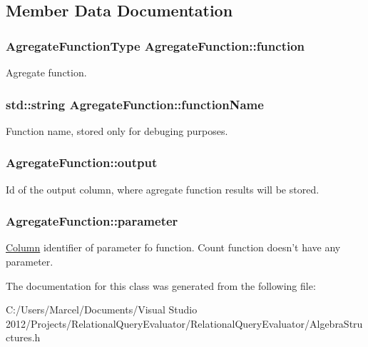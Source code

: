\subsection{Member Data Documentation}
\hypertarget{class_agregate_function_afc2ef5318021e8fa5aac765f48cc2561}{
\subsubsection[{function}]{\setlength{\rightskip}{0pt plus 5cm}Agregate\+Function\+Type Agregate\+Function\+::function}}\label{class_agregate_function_afc2ef5318021e8fa5aac765f48cc2561}
Agregate function. \hypertarget{class_agregate_function_a06046f10f3072c4ef6300b51f283ed3f}{
\subsubsection[{function\+Name}]{\setlength{\rightskip}{0pt plus 5cm}std\+::string Agregate\+Function\+::function\+Name}}\label{class_agregate_function_a06046f10f3072c4ef6300b51f283ed3f}
Function name, stored only for debuging purposes. \hypertarget{class_agregate_function_ae78c0ff39b17f1d341f89c6660d7f448}{
\subsubsection[{output}]{ Agregate\+Function\+::output}}\label{class_agregate_function_ae78c0ff39b17f1d341f89c6660d7f448}
Id of the output column, where agregate function results will be stored. \hypertarget{class_agregate_function_ad37427d3dee4bc5dc7a76d5997bb22fc}{
\subsubsection[{parameter}]{ Agregate\+Function\+::parameter}}\label{class_agregate_function_ad37427d3dee4bc5dc7a76d5997bb22fc}
\hyperlink{class_column}{Column} identifier of parameter fo function. Count function doesn't have any parameter. 

The documentation for this class was generated from the following file\+:\begin{DoxyCompactItemize}
\item 
C\+:/\+Users/\+Marcel/\+Documents/\+Visual Studio 2012/\+Projects/\+Relational\+Query\+Evaluator/\+Relational\+Query\+Evaluator/Algebra\+Structures.\+h\end{DoxyCompactItemize}
